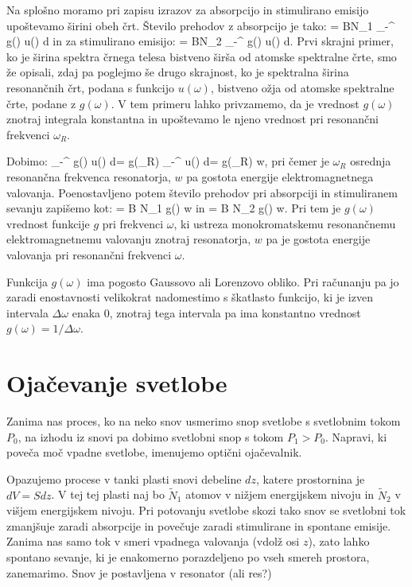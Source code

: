 Na splošno moramo pri zapisu izrazov za absorpcijo in stimulirano emisijo 
upoštevamo širini obeh črt. Število prehodov z absorpcijo je tako:
\beq
{} = BN_1 \int_{-\infty}^{\infty} g(\omega) u(\omega) d\omega
\eeq
in za stimulirano emisijo:
\beq
{} = BN_2 \int_{-\infty}^{\infty} g(\omega) u(\omega) d\omega.
\eeq
Prvi skrajni primer, ko je širina spektra črnega telesa bistveno širša
od atomske spektralne črte, smo že opisali, zdaj pa poglejmo še drugo skrajnost, 
ko je spektralna širina resonančnih črt, podana s funkcijo $u(\omega)$, bistveno 
ožja od atomske spektralne črte, podane z $g(\omega)$. V tem primeru 
lahko privzamemo, da je vrednost $g(\omega)$ znotraj integrala konstantna in 
upoštevamo le njeno vrednost pri resonančni frekvenci $\omega_R$.

Dobimo:
\beq
\int_{-\infty}^{\infty} g(\omega) u(\omega) d\omega = g(\omega_R) \int_{-\infty}^{\infty}
u(\omega) d\omega = g(\omega_R) w,
\eeq
pri čemer je $\omega_R$ osrednja resonančna frekvenca resonatorja, $w$ pa gostota
energije elektromagnetnega valovanja. Poenostavljeno potem število prehodov pri absorpciji
in stimuliranem sevanju zapišemo kot:
\beq
{} = B N_1 g(\omega) w
\eeq
in
\beq
{} = B N_2 g(\omega) w.
\eeq
Pri tem je $g(\omega)$ vrednost funkcije $g$ pri frekvenci $\omega$, ki ustreza monokromatskemu
resonančnemu elektromagnetnemu valovanju znotraj resonatorja, $w$ pa je gostota
energije valovanja pri resonančni frekvenci $\omega$. 

Funkcija $g(\omega)$ ima pogosto Gaussovo ali Lorenzovo obliko. Pri računanju pa jo
zaradi enostavnosti velikokrat nadomestimo s škatlasto funkcijo, ki je izven intervala $\Delta \omega$
enaka 0, znotraj tega intervala pa ima konstantno vrednost $g(\omega) = 1/\Delta \omega$.

\section{Ojačevanje svetlobe}
Zanima nas proces, ko na neko snov usmerimo snop svetlobe s svetlobnim tokom $P_0$, na izhodu
iz snovi pa dobimo svetlobni snop s tokom $P_1 > P_0$.  Napravi, ki poveča moč vpadne svetlobe, 
imenujemo optični ojačevalnik. 

Opazujemo procese v tanki plasti snovi debeline $dz$, katere prostornina je $dV = S dz$. V
tej tej plasti naj bo $\tilde{N}_1$ atomov v nižjem energijskem nivoju in $\tilde{N}_2$ 
v višjem energijskem nivoju.
Pri potovanju svetlobe skozi tako snov se svetlobni tok zmanjšuje zaradi absorpcije in povečuje
zaradi stimulirane in spontane emisije. Zanima nas samo tok v smeri vpadnega valovanja (vdolž osi
$z$), zato lahko spontano sevanje, ki je enakomerno porazdeljeno po vseh smereh prostora, zanemarimo.
Snov je postavljena v resonator (ali res?)

